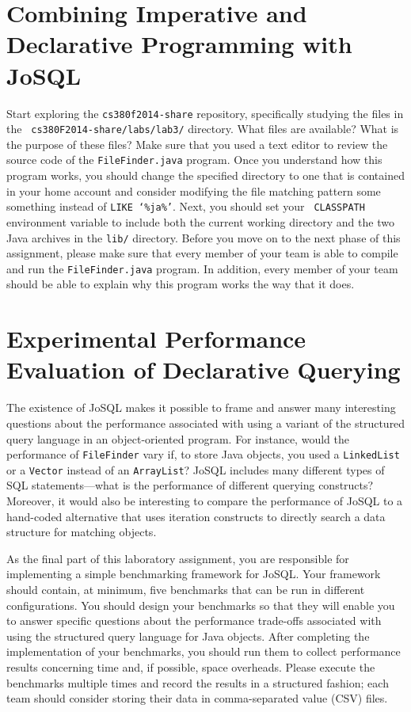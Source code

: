 \section*{Combining Imperative and Declarative Programming with JoSQL}

\begin{sloppypar}

  Start exploring the {\tt cs380f2014-share} repository, specifically studying the files in the {\tt
    cs380F2014-share/labs/lab3/} directory. What files are available? What is the purpose of these files? Make sure that
  you used a text editor to review the source code of the {\tt FileFinder.java} program. Once you understand how this
  program works, you should change the specified directory to one that is contained in your home account and consider
  modifying the file matching pattern some something instead of {\tt LIKE `\%ja\%'}. Next, you should set your {\tt
    CLASSPATH} environment variable to include both the current working directory and the two Java archives in the {\tt lib/}
  directory. Before you move on to the next phase of this assignment, please make sure that every member of your team is
  able to compile and run the {\tt FileFinder.java} program. In addition, every member of your team should be able to
  explain why this program works the way that it does.

\end{sloppypar}

\section*{Experimental Performance Evaluation of Declarative Querying}

The existence of JoSQL makes it possible to frame and answer many interesting questions about the performance associated
with using a variant of the structured query language in an object-oriented program.  For instance, would the
performance of {\tt FileFinder} vary if, to store Java objects, you used a {\tt LinkedList} or a {\tt Vector} instead of
an {\tt ArrayList}?  JoSQL includes many different types of SQL statements---what is the performance of different
querying constructs?  Moreover, it would also be interesting to compare the performance of JoSQL to a hand-coded
alternative that uses iteration constructs to directly search a data structure for matching objects.

As the final part of this laboratory assignment, you are responsible for implementing a simple benchmarking framework
for JoSQL.  Your framework should contain, at minimum, five benchmarks that can be run in different configurations.  You
should design your benchmarks so that they will enable you to answer specific questions about the performance trade-offs
associated with using the structured query language for Java objects.  After completing the implementation of your
benchmarks, you should run them to collect performance results concerning time and, if possible, space overheads.
Please execute the benchmarks multiple times and record the results in a structured fashion; each team should
consider storing their data in comma-separated value (CSV) files.

